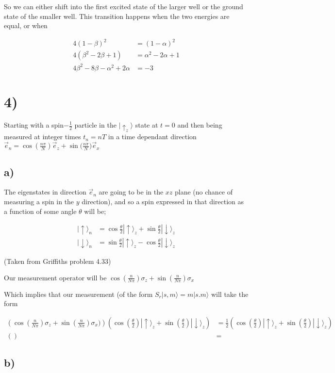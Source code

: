 \documentclass{article}
\newcommand{\p}[1]{\left(#1\right)}
\newcommand{\bra}[1]{|#1\rangle}
\begin{document}
So we can either shift into the first excited state of the larger well or the ground state of the smaller well. This transition happens when the two energies are equal, or when

\begin{align*}
    4(1-\beta)^2&=(1-\alpha)^2\\[1em]
    4(\beta^2-2\beta+1)&=\alpha^2-2\alpha+1\\[1em]
    4\beta^2-8\beta-\alpha^2+2\alpha&=-3
\end{align*}

\section*{4)}
Starting with a spin$-\frac{1}{2}$ particle in the $\bra{\uparrow_z}$ state at $t=0$ and then being measured at integer times $t_n=nT$ in a time dependant direction $\vec{e}_n=\cos{(\frac{n\pi}{N})\vec{e}_z}+\sin{(\frac{n\pi}{N}})\vec{e}_x$

\subsection*{a)}
The eigenstates in direction $\vec{e}_n$ are going to be in the $xz$ plane (no chance of measuring a spin in the $y$ direction), and so a spin expressed in that direction as a function of some angle $\theta$ will be;

\begin{align*}
    \bra{\uparrow}_n&=\cos{\frac{\theta}{2}}\bra{\uparrow}_z+\sin{\frac{\theta}{2}}\bra{\downarrow}_z\\[1em]
    \bra{\downarrow}_n&=\sin{\frac{\theta}{2}}\bra{\uparrow}_z-\cos{\frac{\theta}{2}}\bra{\downarrow}_z
\end{align*}

(Taken from Griffiths problem 4.33)

Our measurement operator will be $\cos(\frac{n}{N\pi})\sigma_z+\sin(\frac{n}{N\pi})\sigma_x$

Which implies that our measurement (of the form $S_r\bra{s,m}=m\bra{s.m}$ will take the form

\begin{align*}
    \p{\cos(\frac{n}{N\pi})\sigma_z+\sin(\frac{n}{N\pi})\sigma_x)}\p{\cos(\frac{\theta}{2})\bra{\uparrow}_z+\sin(\frac{\theta}{2})\bra{\downarrow}_z}&=\frac{1}{2}\p{\cos(\frac{\theta}{2})\bra{\uparrow}_z+\sin(\frac{\theta}{2})\bra{\downarrow}_z}\\[1em]
    \p{}&=
\end{align*}

\subsection*{b)}
\end{document}
